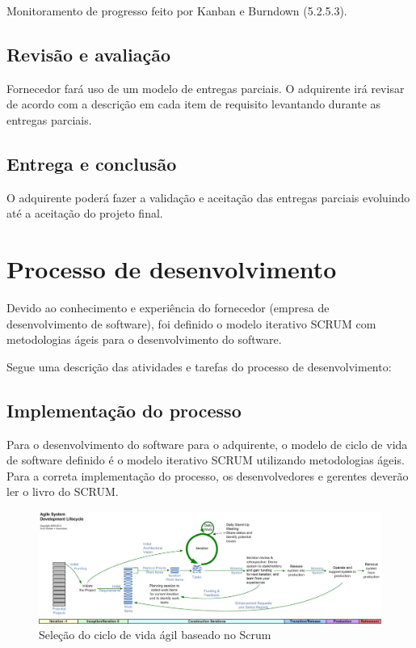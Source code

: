 Monitoramento de progresso feito por Kanban e Burndown (5.2.5.3).

\subsection{Revisão e avaliação}

Fornecedor fará uso de um modelo de entregas parciais. O adquirente irá revisar de acordo com a descrição em cada item de requisito levantando durante as entregas parciais.

\subsection{Entrega e conclusão}

O adquirente poderá fazer a validação e aceitação das entregas parciais evoluindo até a aceitação do projeto final.

\section{Processo de desenvolvimento}
\label{sec:desenvolvimento}

Devido ao conhecimento e experiência do fornecedor (empresa de desenvolvimento de software), foi definido o modelo iterativo SCRUM com metodologias ágeis para o desenvolvimento do software. 

Segue uma descrição das atividades e tarefas do processo de desenvolvimento:

\subsection{Implementação do processo}

Para o desenvolvimento do software para o adquirente, o modelo de ciclo de vida de software definido é o modelo iterativo SCRUM utilizando metodologias ágeis. Para a correta implementação do processo, os desenvolvedores e gerentes deverão ler o livro do SCRUM.

\begin{figure}[!h]
  \centering
  \includegraphics[width=1\textwidth]{lifecyclemodel/images/agileLifecycleDetailed} 
  \caption{Seleção do ciclo de vida ágil baseado no Scrum \cite{ambysoft:09}}
  \label{fig:scrumlifecycle} 
\end{figure}

